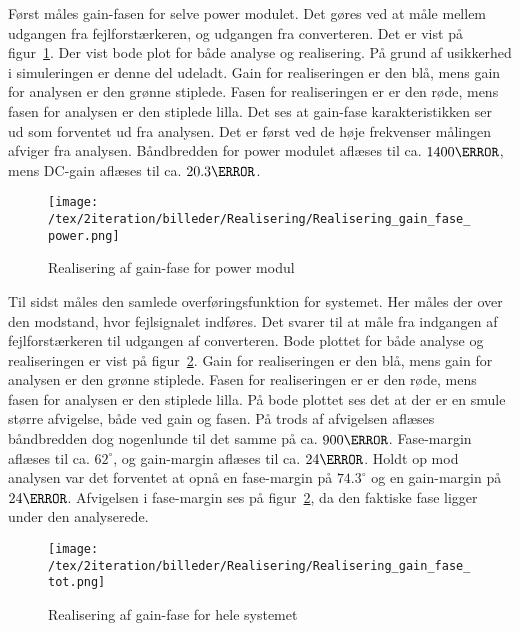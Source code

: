 Først måles gain-fasen for selve power modulet. Det gøres ved at måle mellem udgangen fra fejlforstærkeren, og udgangen fra converteren. Det er vist på figur~\ref{fig:realisering_gain_fase_power}. Der vist bode plot for både analyse og realisering. På grund af usikkerhed i simuleringen er denne del udeladt. Gain for realiseringen er den blå, mens gain for analysen er den grønne stiplede. Fasen for realiseringen er er den røde, mens fasen for analysen er den stiplede lilla. Det ses at gain-fase karakteristikken ser ud som forventet ud fra analysen. Det er først ved de høje frekvenser målingen afviger fra analysen. Båndbredden for power modulet aflæses til ca. $1400\hertz$, mens DC-gain aflæses til ca. $20.3\decibel$.

\begin{figure}[H]
	\center
	\texttt{[image: /tex/2iteration/billeder/Realisering/Realisering\_gain\_fase\_power.png]}
	\caption{Realisering af gain-fase for power modul}
	\label{fig:realisering_gain_fase_power}
\end{figure}



Til sidst måles den samlede overføringsfunktion for systemet. Her måles der over den modstand, hvor fejlsignalet indføres. Det svarer til at måle fra indgangen af fejlforstærkeren til udgangen af converteren. Bode plottet for både analyse og realiseringen er vist på figur~\ref{fig:realisering_gain_fase_tot}. Gain for realiseringen er den blå, mens gain for analysen er den grønne stiplede. Fasen for realiseringen er er den røde, mens fasen for analysen er den stiplede lilla. På bode plottet ses det at der er en smule større afvigelse, både ved gain og fasen. På trods af afvigelsen aflæses båndbredden dog nogenlunde til det samme på ca. $900\hertz$. Fase-margin aflæses til ca. $62^\circ$, og gain-margin aflæses til ca. $24\decibel$. Holdt op mod analysen var det forventet at opnå en fase-margin på $74.3^\circ$ og en gain-margin på $24\decibel$. Afvigelsen i fase-margin ses på figur~\ref{fig:realisering_gain_fase_tot}, da den faktiske fase ligger under den analyserede. 

\begin{figure}[H]
	\center
	\texttt{[image: /tex/2iteration/billeder/Realisering/Realisering\_gain\_fase\_tot.png]}
	\caption{Realisering af gain-fase for hele systemet}
	\label{fig:realisering_gain_fase_tot}
\end{figure}
















